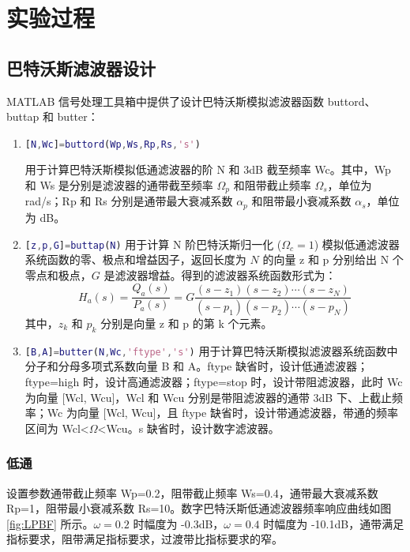 \documentclass[12pt,AutoFakeBold]{article}
\begin{document}
\section{实验过程}

\subsection{巴特沃斯滤波器设计} \label{sec:p1}

MATLAB 信号处理工具箱中提供了设计巴特沃斯模拟滤波器函数 buttord、buttap 和 butter：
%
\begin{enumerate}[(1)]
\item \lstinline[language=Matlab]|[N,Wc]=buttord(Wp,Ws,Rp,Rs,'s')|

用于计算巴特沃斯模拟低通滤波器的阶 N 和 3dB 截至频率 Wc。其中，Wp 和 Ws 是分别是滤波器的通带截至频率 $\Omega_p$ 和阻带截止频率 $\Omega_s$，单位为 rad/s；Rp 和 Rs 分别是通带最大衰减系数 $\alpha_p$ 和阻带最小衰减系数 $\alpha_s$，单位为 dB。

\item  \lstinline[language=Matlab]|[z,p,G]=buttap(N)|
用于计算 N 阶巴特沃斯归一化 ($\Omega_c=1$) 模拟低通滤波器系统函数的零、极点和增益因子，返回长度为 $N$ 的向量 z 和 p 分别给出 N 个零点和极点，$G$ 是滤波器增益。得到的滤波器系统函数形式为：
%
\begin{equation}
H_a(s)=\frac{Q_a(s)}{P_a(s)}=G\frac{(s-z_1)(s-z_2)\cdots(s-z_N)}{(s-p_1)(s-p_2)\cdots(s-p_N)}
\end{equation}
%
其中，$z_k$ 和 $p_k$ 分别是向量 z 和 p 的第 k 个元素。

\item \lstinline[language=Matlab]|[B,A]=butter(N,Wc,'ftype','s')|
用于计算巴特沃斯模拟滤波器系统函数中分子和分母多项式系数向量 B 和 A。ftype 缺省时，设计低通滤波器；ftype=high 时，设计高通滤波器；ftype=stop 时，设计带阻滤波器，此时 Wc 为向量 [Wcl, Wcu]，Wcl 和 Wcu 分别是带阻滤波器的通带 3dB 下、上截止频率；Wc 为向量 [Wcl, Wcu]，且 ftype 缺省时，设计带通滤波器，带通的频率区间为 Wcl<$\Omega$<Wcu。s 缺省时，设计数字滤波器。
\end{enumerate}

\subsubsection{低通}

设置参数通带截止频率 Wp=0.2，阻带截止频率 Ws=0.4，通带最大衰减系数 Rp=1，阻带最小衰减系数 Rs=10。数字巴特沃斯低通滤波器频率响应曲线如图 \ref{fig:LPBF} 所示。$\omega=0.2$ 时幅度为 -0.3dB，$\omega=0.4$ 时幅度为 -10.1dB，通带满足指标要求，阻带满足指标要求，过渡带比指标要求的窄。
\end{document}
